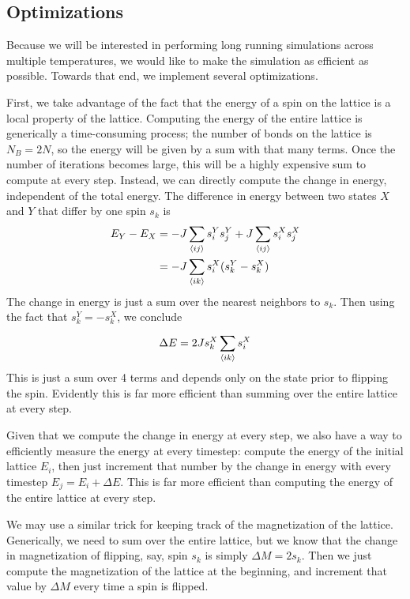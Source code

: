 \documentclass[twocolumn,aps,prl]{revtex4-1} %
\begin{document}
\subsection{Optimizations}
Because we will be interested in performing long running simulations across multiple temperatures, we would like to make the simulation as efficient as possible. Towards that end, we implement several optimizations.

First, we take advantage of the fact that the energy of a spin on the lattice is a local property of the lattice. Computing the energy of the entire lattice is generically a time-consuming process; the number of bonds on the lattice is $N_B = 2N$, so the energy will be given by a sum with that many terms. Once the number of iterations becomes large, this will be a highly expensive sum to compute at every step. Instead, we can directly compute the change in energy, independent of the total energy. The difference in energy between two states $X$ and $Y$ that differ by one spin $s_k$ is
\begin{align}
E_Y - E_X &= -J\sum_{\braket{ij}}s^Y_is^Y_j + J\sum_{\braket{ij}}s^X_is^X_j \\
&= -J\sum_{\braket{ik}}s^X_i(s^Y_k-s^X_k)
\end{align}
The change in energy is just a sum over the nearest neighbors to $s_k$. Then using the fact that $s^Y_k = -s_k^X$, we conclude
\begin{equation}
\Delta E = 2Js_k^X\sum_{\braket{ik}}^{}s_i^X
\end{equation}
This is just a sum over 4 terms and depends only on the state prior to flipping the spin. Evidently this is far more efficient than summing over the entire lattice at every step.

Given that we compute the change in energy at every step, we also have a way to efficiently measure the energy at every timestep: compute the energy of the initial lattice $E_i$, then just increment that number by the change in energy with every timestep $E_j = E_i + \Delta E$. This is far more efficient than computing the energy of the entire lattice at every step.

We may use a similar trick for keeping track of the magnetization of the lattice. Generically, we need to sum over the entire lattice, but we know that the change in magnetization of flipping, say, spin $s_k$ is simply $\Delta M = 2s_k$. Then we just compute the magnetization of the lattice at the beginning, and increment that value by $\Delta M$ every time a spin is flipped.
\end{document}

